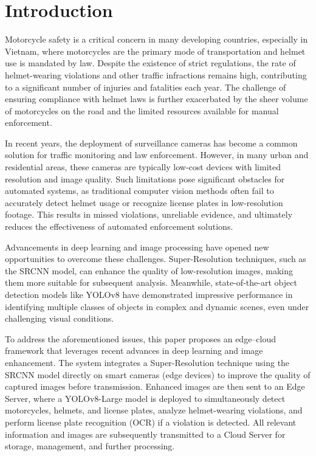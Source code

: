 \documentclass[conference]{IEEEtran}
\begin{document}
\section{Introduction}
\label{intro}

Motorcycle safety is a critical concern in many developing countries, especially in Vietnam, where motorcycles are the primary mode of transportation and helmet use is mandated by law. Despite the existence of strict regulations, the rate of helmet-wearing violations and other traffic infractions remains high, contributing to a significant number of injuries and fatalities each year. The challenge of ensuring compliance with helmet laws is further exacerbated by the sheer volume of motorcycles on the road and the limited resources available for manual enforcement.

In recent years, the deployment of surveillance cameras has become a common solution for traffic monitoring and law enforcement. However, in many urban and residential areas, these cameras are typically low-cost devices with limited resolution and image quality. Such limitations pose significant obstacles for automated systems, as traditional computer vision methods often fail to accurately detect helmet usage or recognize license plates in low-resolution footage. This results in missed violations, unreliable evidence, and ultimately reduces the effectiveness of automated enforcement solutions.

Advancements in deep learning and image processing have opened new opportunities to overcome these challenges. Super-Resolution techniques, such as the SRCNN model, can enhance the quality of low-resolution images, making them more suitable for subsequent analysis. Meanwhile, state-of-the-art object detection models like YOLOv8 have demonstrated impressive performance in identifying multiple classes of objects in complex and dynamic scenes, even under challenging visual conditions.

To address the aforementioned issues, this paper proposes an edge–cloud framework that leverages recent advances in deep learning and image enhancement. The system integrates a Super-Resolution technique using the SRCNN model directly on smart cameras (edge devices) to improve the quality of captured images before transmission. Enhanced images are then sent to an Edge Server, where a YOLOv8-Large model is deployed to simultaneously detect motorcycles, helmets, and license plates, analyze helmet-wearing violations, and perform license plate recognition (OCR) if a violation is detected. All relevant information and images are subsequently transmitted to a Cloud Server for storage, management, and further processing.
\end{document}
